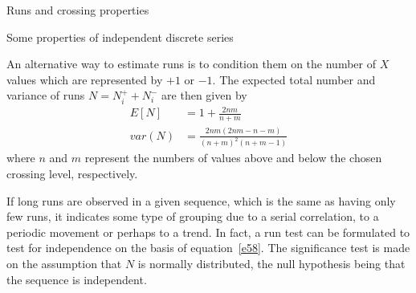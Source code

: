 \documentclass[8pt]{beamer}
\renewcommand{\emph}[1]{\textcolor{myorange}{#1}}
\begin{document}
 \begin{frame}{Runs and crossing properties}
     \begin{block}{Some properties of independent discrete series}
    \end{block}
     An alternative way to estimate \emph{runs} is to condition them on the number of $X$ values which are represented by $+1$ or $-1$. The expected total number and variance of \emph{runs}  $N= N_i^+ + N_i^-$ are then given by 
    \begin{equation}
    \begin{aligned}
        E[N] &= 1 + \frac{2nm}{n+m}\\
        var(N) &= \frac{2nm(2nm-n-m)}{(n+m)^2 (n+m-1)}
    \end{aligned}
    \label{e58}
    \end{equation}
    where $n$ and $m$ represent the numbers of values above and below the chosen \emph{crossing level}, respectively.
    
    If \emph{long runs} are observed in a given sequence, which is the same as having only few runs, it indicates some type of grouping due to a \emph{serial correlation}, to a \emph{periodic movement} or perhaps to a \emph{trend}. In fact, a \emph{run test} can be formulated to test for independence on the basis of equation~\ref{e58}. The significance test is made on the assumption that $N$ is \emph{normally distributed}, the \emph{null hypothesis} being that the sequence is \emph{independent}. 
\end{frame}

\end{document}
